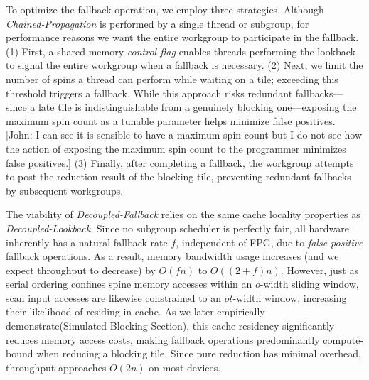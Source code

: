 \documentclass[sigconf]{acmart}
\newcommand{\john}[1]{{\footnotesize\color{cyan}[John: #1]}}
\begin{document}
To optimize the fallback operation, we employ three strategies. Although \emph{Chained-Propagation} is performed by a single thread or subgroup, for performance reasons we want the entire workgroup to participate in the fallback. (1) First, a shared memory \emph{control flag} enables threads performing the lookback to signal the entire workgroup when a fallback is necessary. (2) Next, we limit the number of spins a thread can perform while waiting on a tile; exceeding this threshold triggers a fallback. While this approach risks redundant fallbacks---since a late tile is indistinguishable from a genuinely blocking one---exposing the maximum spin count as a tunable parameter helps minimize false positives. \john{I can see it is sensible to have a maximum spin count but I do not see how the action of exposing the maximum spin count to the programmer minimizes false positives.} (3) Finally, after completing a fallback, the workgroup attempts to post the reduction result of the blocking tile, preventing redundant fallbacks by subsequent workgroups.

The viability of \emph{Decoupled-Fallback} relies on the same cache locality properties as \emph{Decoupled-Lookback}. Since no subgroup scheduler is perfectly fair, all hardware inherently has a natural fallback rate $f$\!, independent of FPG, due to \emph{false-positive} fallback operations. As a result, memory bandwidth usage increases (and we expect throughput to decrease) by $O(fn)$ to $O((2 + f)n)$. However, just as serial ordering confines spine memory accesses within an $o$-width sliding window, scan input accesses are likewise constrained to an $ot$-width window, increasing their likelihood of residing in cache. As we later empirically demonstrate(Simulated Blocking Section), this cache residency significantly reduces memory access costs, making fallback operations predominantly compute-bound when reducing a blocking tile. Since pure reduction has minimal overhead, throughput approaches $O(2n)$ on most devices.
\end{document}
